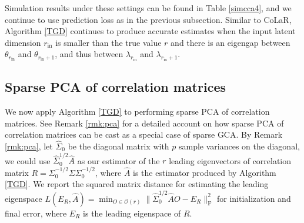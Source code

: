 \documentclass[11pt]{article}
\newcommand{\nb}[1]{\textcolor{orange}{\texttt{[#1]}}}
\newcommand{\gsc}[1]{\textcolor{blue}{\texttt{[#1]}}}
\newcommand{\blue}{\color{black}}
\newcommand{\ha}{\widehat{A}}
\newcommand{\0}{{\mathbf{0}}}
\begin{document}
Simulation results under these settings can be found in Table \ref{simcca4}, and we continue to use prediction loss as in the previous subsection.
Similar to CoLaR, Algorithm \ref{TGD} continues to produce accurate estimates when the input latent dimension $r_{\mathrm{in}}$ is smaller than the true value $r$ and there is an eigengap between {$\theta_{r_{\mathrm{in}}}$ and $\theta_{r_{\mathrm{in}}+1}$, and thus between  $\lambda_{r_{\mathrm{in}}}$ and $\lambda_{r_{\mathrm{in}}+1}$.}


\subsection{Sparse PCA of correlation matrices}

We now apply Algorithm \ref{TGD} to performing sparse PCA of correlation matrices.
See Remark \ref{rmk:pca} for a detailed account on how sparse PCA of correlation matrices can be cast as a special case of sparse GCA.
By Remark \ref{rmk:pca}, let $\widehat{\Sigma}_0$ be the diagonal matrix with $p$ sample variances on the diagonal, we could use $\widehat{\Sigma}_0^{1/2}\widehat{A}$ as our estimator of the $r$ leading eigenvectors of correlation matrix $R = \Sigma_0^{-1/2}\Sigma\Sigma_0^{-1/2}$, where $\widehat{A}$ is the estimator produced by Algorithm \ref{TGD}.
{We report the squared matrix distance for estimating the leading eigenspace $L(E_R,\widehat{A}) = \min_{O\in\mathcal{O}(r)}\|\widehat{\Sigma}_0^{1/2}\widehat{A}O-E_R\|_\mathrm{F}^2$ for initialization and final error, where $E_R$ is the leading eigenspace of $R$.}
\end{document}
